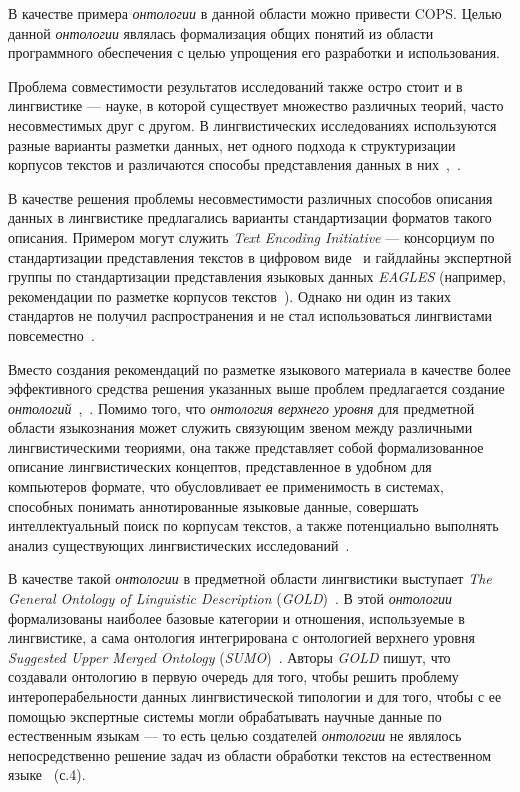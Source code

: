 В качестве примера \textit{онтологии} в данной области можно привести COPS\cite{Lando2007}.
Целью данной \textit{онтологии} являлась формализация общих понятий из области программного обеспечения с целью упрощения его разработки и использования.

Проблема совместимости результатов исследований также остро стоит и в лингвистике --- науке, в которой существует множество различных теорий, часто несовместимых друг с другом.
В лингвистических исследованиях используются разные варианты разметки данных, нет одного подхода к структуризации корпусов текстов и различаются способы представления данных в них~\cite{Farrar2002},~\cite{Chiarcos2012}.

В качестве решения проблемы несовместимости различных способов описания данных в лингвистике предлагались варианты стандартизации форматов такого описания.
Примером могут служить \textit{Text Encoding Initiative} --- консорциум по стандартизации представления текстов в цифровом виде~\cite{Text2022} и гайдлайны экспертной группы по стандартизации представления языковых данных \textit{EAGLES} (например, рекомендации по разметке корпусов текстов~\cite{EAGLES2022}).
Однако ни один из таких стандартов не получил распространения и не стал использоваться лингвистами повсеместно~\cite[p.~4]{Ide2010}.

Вместо создания рекомендаций по разметке языкового материала в качестве более эффективного средства решения указанных выше проблем предлагается создание \textit{онтологий}~\cite{Schalley2019},~\cite{Mccrae2015}.
Помимо того, что \textit{онтология верхнего уровня} для предметной области языкознания может служить связующим звеном между различными лингвистическими теориями, она также представляет собой формализованное описание лингвистических концептов, представленное в удобном для компьютеров формате, что обусловливает ее применимость в системах, способных понимать аннотированные языковые данные, совершать интеллектуальный поиск по корпусам текстов, а также потенциально выполнять анализ существующих лингвистических исследований~\cite{Farrar2002}.

В качестве такой \textit{онтологии} в предметной области лингвистики выступает \textit{The General Ontology of Linguistic Description} (\textit{GOLD})~\cite{GOLD2022}.
В этой \textit{онтологии} формализованы наиболее базовые категории и отношения, используемые в лингвистике, а сама онтология интегрирована с онтологией верхнего уровня \textit{Suggested Upper Merged Ontology} (\textit{SUMO})~\cite{Pease2002}.
Авторы \textit{GOLD} пишут, что создавали онтологию в первую очередь для того, чтобы решить проблему интероперабельности данных лингвистической типологии и для того, чтобы с ее помощью экспертные системы могли обрабатывать научные данные по естественным языкам --- то есть целью создателей \textit{онтологии} не являлось непосредственно решение задач из области обработки текстов на естественном языке~\cite{Farrar2003} (с.4).

